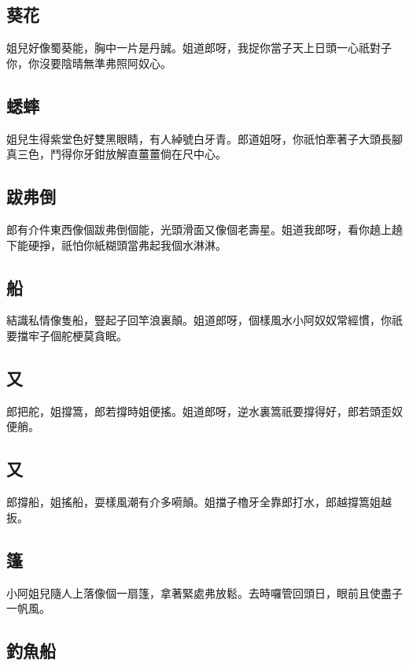 \subsection*{葵花}

姐兒好像蜀葵能，胸中一片是丹誠。姐道郎呀，我捉你當子天上日頭一心祇對子你，你沒要陰晴無準弗照阿奴心。

\subsection*{蟋蟀}

姐兒生得紫堂色好雙黑眼睛，有人綽號白牙青。郎道姐呀，你祇怕牽著子大頭長腳真三色，鬥得你牙鉗放解直薑薑倘在尺中心。

\subsection*{跋弗倒}

郎有介件東西像個跋弗倒個能，光頭滑面又像個老壽星。姐道我郎呀，看你趬上趬下能硬掙，祇怕你紙糊頭當弗起我個水淋淋。

\subsection*{船}

結識私情像隻船，豎起子回竿浪裏顛。姐道郎呀，個樣風水小阿奴奴常經慣，你祇要擋牢子個舵梗莫貪眠。

\subsection*{又}

郎把舵，姐撐篙，郎若撐時姐便搖。姐道郎呀，逆水裏篙祇要撐得好，郎若頭歪奴便艄。

\subsection*{又}

郎撐船，姐搖船，耍樣風潮有介多嗬顛。姐擋子櫓牙全靠郎打水，郎越撐篙姐越扳。

\subsection*{篷}

小阿姐兒隨人上落像個一扇篷，拿著緊處弗放鬆。去時囉管回頭日，眼前且使盡子一帆風。

\subsection*{釣魚船}

